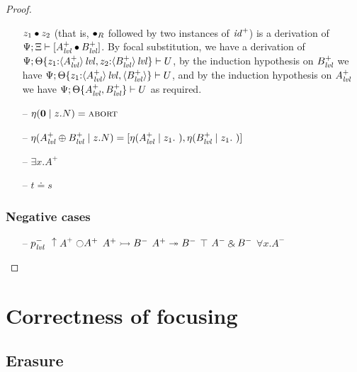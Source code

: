 \begin{proof}
\begin{itemize}
  $\tfuser{z_1}{z_2}$ (that is, ${\fuse}_R$ followed by two instances of 
  ${\it id}^+$) is a derivation of 
  $\foc{\Psi}{\Xi}{[A^+_\mlvl \fuse B^+_\mlvl]}$.
  By focal substitution, we have
  a derivation of 
  $\foc{\Psi}{\tackon{\Theta}
              {\mkconj{z_1{:}\islvl{\susp{A^+_\mlvl}}}
                      {z_2{:}\islvl{\susp{B^+_\mlvl}}}}}{U}$,
  by the induction hypothesis on $B^+_\mlvl$ we have
  $\foc{\Psi}{\tackon{\Theta}
              {\mkconj{z_1{:}\islvl{\susp{A^+_\mlvl}}}
                      {\susp{B^+_\mlvl}}}}{U}$, and by
  the induction hypothesis on $A^+_\mlvl$ we have
   $\foc{\Psi}{\tackon{\Theta}
              {\mkconj{A^+_\mlvl}
                      {B^+_\mlvl}}}{U}$ as required.
  \smallskip
 
\item[--] $\etapa{z}{N}{\zero} = \tabort$ 

\item[--] $\etapa{z}{N}{A^+_\mlvl \oplus B^+_\mlvl} = 
           \toplusl
            {\etapa{z_1}{~}{A^+_\mlvl}}
            {\etapa{z_1}{~}{B^+_\mlvl}}$

\item[--] $\exists x. A^+$ 

\item[--] $t \doteq s$

\end{itemize}

\subsubsection{Negative cases}

\begin{itemize}
\item[--] $p^-_\mlvl$
 ${\uparrow}A^+$
 ${\ocircle}A^+$
 $A^+ \lefti B^-$
 $A^+ \righti B^-$
 $\top$ 
 $A^- \with B^-$
 $\forall x.A^-$

\end{itemize}

\end{proof}

\section{Correctness of focusing}
\label{sec:ord-correctness}

\subsection{Erasure}

